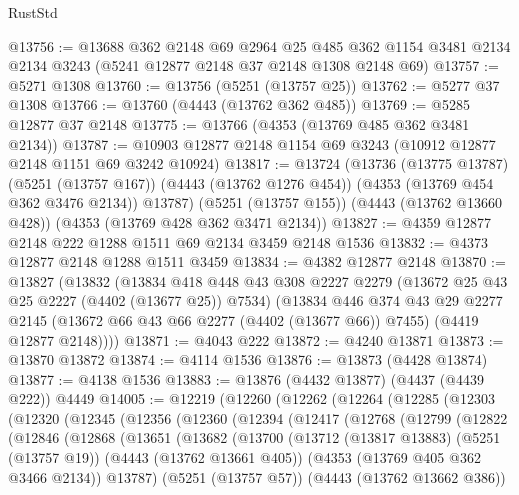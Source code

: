 \begin{lexlean}{RustStd}
\begin{coremodule}
@13756 := @13688
    @362
    @2148
    @69
    @2964
    @25
    @485
    @362
    @1154
    @3481
    @2134
    @2134
    @3243
    (@5241 @12877 @2148 @37 @2148 @1308 @2148 @69)
@13757 := @5271 @1308
@13760 := @13756 (@5251 (@13757 @25))
@13762 := @5277 @37 @1308
@13766 := @13760 (@4443 (@13762 @362 @485))
@13769 := @5285 @12877 @37 @2148
@13775 := @13766 (@4353 (@13769 @485 @362 @3481 @2134))
@13787 := @10903 @12877 @2148 @1154 @69 @3243 (@10912 @12877 @2148 @1151 @69 @3242 @10924)
@13817 := @13724
    (@13736
      (@13775 @13787)
      (@5251 (@13757 @167))
      (@4443 (@13762 @1276 @454))
      (@4353 (@13769 @454 @362 @3476 @2134))
      @13787)
    (@5251 (@13757 @155))
    (@4443 (@13762 @13660 @428))
    (@4353 (@13769 @428 @362 @3471 @2134))
@13827 := @4359 @12877 @2148 @222 @1288 @1511 @69 @2134 @3459 @2148 @1536
@13832 := @4373 @12877 @2148 @1288 @1511 @3459
@13834 := @4382 @12877 @2148
@13870 := @13827
    (@13832
      (@13834
        @418
        @448
        @43
        @308
        @2227
        @2279
        (@13672 @25 @43 @25 @2227 (@4402 (@13677 @25)) @7534)
        (@13834
          @446
          @374
          @43
          @29
          @2277
          @2145
          (@13672 @66 @43 @66 @2277 (@4402 (@13677 @66)) @7455)
          (@4419 @12877 @2148))))
@13871 := @4043 @222
@13872 := @4240 @13871
@13873 := @13870 @13872
@13874 := @4114 @1536
@13876 := @13873 (@4428 @13874)
@13877 := @4138 @1536
@13883 := @13876 (@4432 @13877) (@4437 (@4439 @222)) @4449
@14005 := @12219
    (@12260
      (@12262
        (@12264
          (@12285
            (@12303
              (@12320
                (@12345
                  (@12356
                    (@12360
                      (@12394
                        (@12417
                          (@12768
                            (@12799
                              (@12822
                                (@12846
                                  (@12868
                                    (@13651
                                      (@13682
                                        (@13700
                                          (@13712
                                            (@13817 @13883)
                                            (@5251 (@13757 @19))
                                            (@4443 (@13762 @13661 @405))
                                            (@4353 (@13769 @405 @362 @3466 @2134))
                                            @13787)
                                          (@5251 (@13757 @57))
                                          (@4443 (@13762 @13662 @386))

\end{coremodule}
\end{lexlean}
